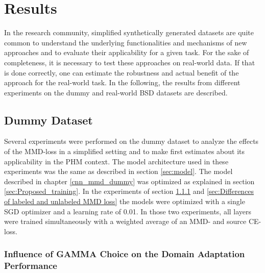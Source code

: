 \chapter{Results}\label{chapter:results}
In the research community, simplified synthetically generated datasets are quite common to understand the underlying functionalities and mechanisms of new approaches and to evaluate their applicability for a given task. For the sake of completeness, it is necessary to test these approaches on real-world data. If that is done correctly, one can estimate the robustness and actual benefit of the approach for the real-world task. In the following, the results from different experiments on the dummy and real-world BSD datasets are described.

\section{Dummy Dataset}\label{sec:results_dummy_dataset}
Several experiments were performed on the dummy dataset to analyze the effects of the MMD-loss in a simplified setting and to make first estimates about its applicability in the PHM context. The model architecture used in these experiments was the same as described in section \ref{sec:model}. The model described in chapter \ref{cnn_mmd_dummy} was optimized as explained in section \ref{sec:Proposed_training}. In the experiments of section \ref{sec:Balancing Cross-Entropy and MMD loss} and \ref{sec:Differences of labeled and unlabeled MMD loss} the models were optimized with a single SGD optimizer and a learning rate of 0.01. In those two experiments, all layers were trained simultaneously with a weighted average of an MMD- and source CE-loss.

\subsection{Influence of GAMMA Choice on the Domain Adaptation Performance} \label{sec:Balancing Cross-Entropy and MMD loss}

